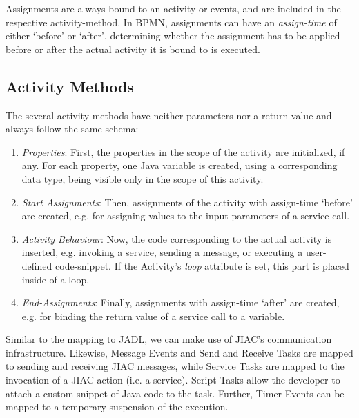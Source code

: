 Assignments are always bound to an activity or events, and are included in the
respective activity-method.  In BPMN, assignments can have an \emph{assign-time}
of either `before' or `after', determining whether the assignment has to be
applied before or after the actual activity it is bound to is executed.



\subsection{Activity Methods}

The several activity-methods have neither parameters nor a return value and always
follow the same schema:

\begin{enumerate}
	\item \emph{Properties}: First, the properties in the scope of the activity
	are initialized, if any.  For each property, one Java variable is created,
	using a corresponding data type, being visible only in the scope of this
	activity.
	
	\item \emph{Start Assignments}: Then, assignments of the activity with
	assign-time `before' are created, e.g. for assigning values to the input
	parameters of a service call.
	
	\item \emph{Activity Behaviour}: Now, the code corresponding to the actual
	activity is inserted, e.g. invoking a service, sending a message, or executing
	a user-defined code-snippet.  If the Activity's \emph{loop} attribute is set,
	this part is placed inside of a loop.
	
	\item \emph{End-Assignments}: Finally, assignments with assign-time `after'
	are created, e.g. for binding the return value of a service call to a variable.
\end{enumerate}

Similar to the mapping to JADL, we can make use of JIAC's communication
infrastructure.  Likewise, Message Events and Send and Receive Tasks are mapped
to sending and receiving JIAC messages, while Service Tasks are mapped to the
invocation of a JIAC action (i.e. a service).  Script Tasks allow the developer
to attach a custom snippet of Java code to the task.  Further, Timer Events can
be mapped to a temporary suspension of the execution.

